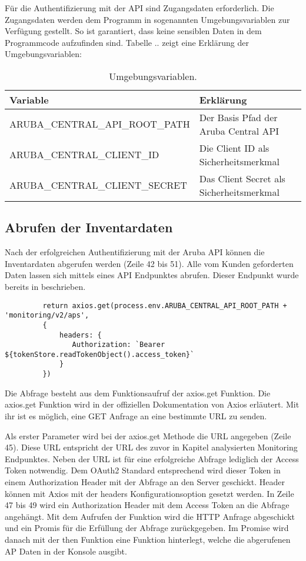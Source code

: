 Für die Authentifizierung mit der API sind Zugangsdaten erforderlich. Die Zugangsdaten werden dem Programm in sogenannten Umgebungsvariablen zur Verfügung gestellt. So ist garantiert, dass keine sensiblen Daten in dem Programmcode aufzufinden sind. Tabelle .. zeigt eine Erklärung der Umgebungsvariablen:


\begin{table}[htb]
\centering
\begin{tabular}{l|l}
    \textbf{Variable} & \textbf{Erklärung} \\
    \hline
    ARUBA\_CENTRAL\_API\_ROOT\_PATH & Der Basis Pfad der Aruba Central API \\
    \hline
    ARUBA\_CENTRAL\_CLIENT\_ID & Die Client ID als Sicherheitsmerkmal \\
    \hline
    ARUBA\_CENTRAL\_CLIENT\_SECRET & Das Client Secret als Sicherheitsmerkmal \\
\end{tabular}
\caption{Umgebungsvariablen.}
\label{tab:Umgebungsvariablen}
\end{table}

\subsection{Abrufen der Inventardaten}\label{subsection:abrufen-der-Inventardaten}

Nach der erfolgreichen Authentifizierung mit der Aruba API können die Inventardaten abgerufen werden (Zeile 42 bis 51). Alle vom Kunden geforderten Daten lassen sich mittels eines API Endpunktes abrufen. Dieser Endpunkt wurde bereits in beschrieben. 

\lstset{firstnumber=13}
\begin{lstlisting}
         return axios.get(process.env.ARUBA_CENTRAL_API_ROOT_PATH + 'monitoring/v2/aps',
         {
             headers: {
          		Authorization: `Bearer ${tokenStore.readTokenObject().access_token}`
             }
         })    
\end{lstlisting}

Die Abfrage besteht aus dem Funktionsaufruf der axios.get Funktion. Die axios.get Funktion wird in der offiziellen Dokumentation von Axios erläutert. Mit ihr ist es möglich, eine GET Anfrage an eine bestimmte URL zu senden. 

Als erster Parameter wird bei der axios.get Methode die URL angegeben (Zeile 45). Diese URL entspricht der URL des zuvor in Kapitel analysierten Monitoring Endpunktes. Neben der URL ist für eine erfolgreiche Abfrage lediglich der Access Token notwendig. Dem OAuth2 Standard entsprechend wird dieser Token in einem Authorization Header mit der Abfrage an den Server geschickt. Header können mit Axios mit der headers Konfigurationsoption gesetzt werden. In Zeile 47 bis 49 wird ein Authorization Header mit dem Access Token an die Abfrage angehängt. Mit dem Aufrufen der Funktion wird die HTTP Anfrage abgeschickt und ein Promis für die Erfüllung der Abfrage zurückgegeben. Im Promise wird danach mit der then Funktion eine Funktion hinterlegt, welche die abgerufenen AP Daten in der Konsole ausgibt.

